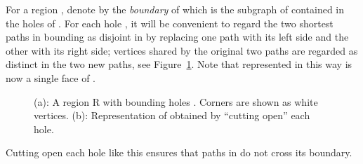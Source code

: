 \documentclass[11pt]{article}
\begin{document}
For a region , denote by  the \emph{boundary} of  which is the subgraph of  contained in the  holes of . For each hole , it will be convenient to regard the two shortest paths in  bounding  as disjoint in  by replacing one path with its left side and the other with its right side; vertices shared by the original two paths are regarded as distinct in the two new paths, see Figure~\ref{fig:EulerTour}. Note that  represented in this way is now a single face of .
\begin{figure}\centerline{}
\caption{(a): A region R with  bounding holes . Corners are shown as white vertices. (b): Representation of  obtained by ``cutting open'' each hole.}
\label{fig:EulerTour}
\end{figure}
Cutting open each hole like this ensures that paths in  do not cross its boundary.
\end{document}
